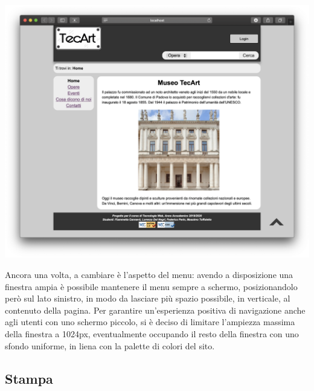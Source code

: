 \begin{center}
	\includegraphics[width=\textwidth]{img/Desktop-pres}
\end{center}
Ancora una volta, a cambiare è l'aspetto del menu: avendo a disposizione una finestra ampia è possibile mantenere il menu sempre a schermo, posizionandolo però sul lato sinistro, in modo da lasciare più spazio possibile, in verticale, al contenuto della pagina. Per garantire un'esperienza positiva di navigazione anche agli utenti con uno schermo piccolo, si è deciso di limitare l'ampiezza massima della finestra a 1024px, eventualmente occupando il resto della finestra con uno sfondo uniforme, in liena con la palette di colori del sito.


\subsection{Stampa}
\label{presentazione-stampa}

